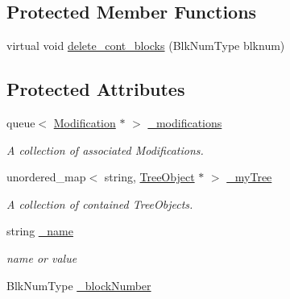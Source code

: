 \subsection*{Protected Member Functions}
\begin{DoxyCompactItemize}
\item 
virtual void \mbox{\hyperlink{classTreeObject_a07f5f5de1cff0cfdc2372e81559f5181}{delete\+\_\+cont\+\_\+blocks}} (Blk\+Num\+Type blknum)
\end{DoxyCompactItemize}
\subsection*{Protected Attributes}
\begin{DoxyCompactItemize}
\item 
\mbox{\label{classTreeObject_ac285793f5d7cba8069670210606c66c7}} 
queue$<$ \mbox{\hyperlink{classModification}{Modification}} $\ast$ $>$ \mbox{\hyperlink{classTreeObject_ac285793f5d7cba8069670210606c66c7}{\+\_\+modifications}}
\begin{DoxyCompactList}\small\item\em A collection of associated Modifications. \end{DoxyCompactList}\item 
\mbox{\label{classTreeObject_a59effca19a3475c84496c7f82c856d38}} 
unordered\+\_\+map$<$ string, \mbox{\hyperlink{classTreeObject}{Tree\+Object}} $\ast$ $>$ \mbox{\hyperlink{classTreeObject_a59effca19a3475c84496c7f82c856d38}{\+\_\+my\+Tree}}
\begin{DoxyCompactList}\small\item\em A collection of contained Tree\+Objects. \end{DoxyCompactList}\item 
\mbox{\label{classTreeObject_a368b410ed9b21c7106babf2ba93399b3}} 
string \mbox{\hyperlink{classTreeObject_a368b410ed9b21c7106babf2ba93399b3}{\+\_\+name}}
\begin{DoxyCompactList}\small\item\em name or value \end{DoxyCompactList}\item 
\mbox{\label{classTreeObject_a17cfa5bde700978b4ec326909362bd2c}} 
Blk\+Num\+Type \mbox{\hyperlink{classTreeObject_a17cfa5bde700978b4ec326909362bd2c}{\+\_\+block\+Number}}

\end{DoxyCompactItemize}

